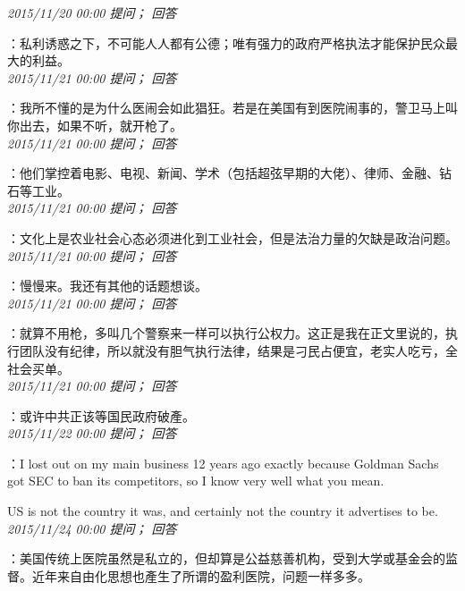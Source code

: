 \documentclass[twocolumn]{ctexart}
\begin{document}
\textit{\hfill\noindent\small 2015/11/20 00:00 提问； 回答}

：私利诱惑之下，不可能人人都有公德；唯有强力的政府严格执法才能保护民众最大的利益。\\

\textit{\hfill\noindent\small 2015/11/21 00:00 提问； 回答}

：我所不懂的是为什么医闹会如此猖狂。若是在美国有到医院闹事的，警卫马上叫你出去，如果不听，就开枪了。\\

\textit{\hfill\noindent\small 2015/11/21 00:00 提问； 回答}

：他们掌控着电影、电视、新闻、学术（包括超弦早期的大佬）、律师、金融、钻石等工业。\\

\textit{\hfill\noindent\small 2015/11/21 00:00 提问； 回答}

：文化上是农业社会心态必须进化到工业社会，但是法治力量的欠缺是政治问题。\\

\textit{\hfill\noindent\small 2015/11/21 00:00 提问； 回答}

：慢慢来。我还有其他的话题想谈。\\

\textit{\hfill\noindent\small 2015/11/21 00:00 提问； 回答}

：就算不用枪，多叫几个警察来一样可以执行公权力。这正是我在正文里说的，执行团队没有纪律，所以就没有胆气执行法律，结果是刁民占便宜，老实人吃亏，全社会买单。\\

\textit{\hfill\noindent\small 2015/11/21 00:00 提问； 回答}

：或许中共正该等国民政府破產。\\

\textit{\hfill\noindent\small 2015/11/22 00:00 提问； 回答}

：I lost out on my main business 12 years ago exactly because Goldman Sachs got SEC to ban its competitors, so I know very well what you mean.

US is not the country it was, and certainly not the country it advertises to be.\\

\textit{\hfill\noindent\small 2015/11/24 00:00 提问； 回答}

：美国传统上医院虽然是私立的，但却算是公益慈善机构，受到大学或基金会的监督。近年来自由化思想也產生了所谓的盈利医院，问题一样多多。
\end{document}
